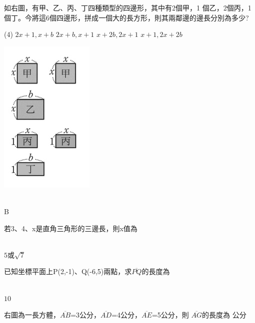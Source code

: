 \documentclass
[answers]
{exam}
\newcommand\ul[1]{\uline{\hspace*{#1}}}
\theoremstyle{definition}
\begin{document}
\begin{questions}

\begin{minipage}[t]{0.7\linewidth}

\question
如右圖，有甲、乙、丙、丁四種類型的四邊形，其中有2個甲，1 個乙，2個丙，1個丁。今將這6個四邊形，拼成一個大的長方形，則其兩鄰邊的邊長分別為多少?
\begin{tasks}(4)
	\task $2x+1,x+b$
	\task $2x+b,x+1$
	\task $x+2b,2x+1$
	\task $x+1,2x+2b$
\end{tasks}


\end{minipage}
\hfill
\begin{minipage}[t]{0.3\linewidth}
\vspace*{-0.3cm}
\includegraphics[scale=0.5]{./figure/A_1.jpg}
\raggedleft %
\end{minipage}

\begin{solution}~\\
	B
\end{solution}
\question
若3、4、x是直角三角形的三邊長，則x值為\ul{50pt}
\begin{solution}~\\
	$5$或$\sqrt{7}$
\end{solution}

\question
已知坐標平面上P(2,-1)、Q(-6,5)兩點，求$\overline{PQ}$的長度為
\ul{50pt}
\begin{solution}~\\
	$10$
\end{solution}

\begin{minipage}[t]{0.7\linewidth}

\question
右圖為一長方體，$\overline{AB}$=3公分，$\overline{AD}$=4公分，$\overline{AE}$=5公分，則 $\overline{AG}$的長度為
\ul{50pt}公分


\end{minipage}
\end{questions}
\end{document}
